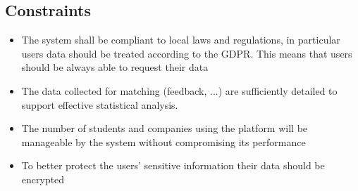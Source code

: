 		\subsection{Constraints}
			\begin{itemize}
				\item The system shall be compliant to local laws and regulations, in particular users data should be treated
				according to the GDPR. This means that users should be always able to request their data
				\item The data collected for matching (feedback, ...) are sufficiently detailed to support effective statistical analysis.
				\item The number of students and companies using the platform will be manageable by the system without compromising its performance
				\item To better protect the users’ sensitive information their data should be encrypted
			\end{itemize}
		